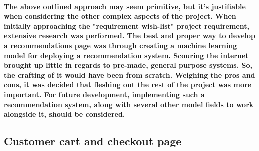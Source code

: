 \documentclass[sigconf]{acmart}
\begin{document}
\paragraph{ The above outlined approach may seem primitive, but it's justifiable when considering the other complex aspects of the project. When initially approaching the "requirement wish-list" project requirement, extensive research was performed. The best and proper way to develop a recommendations page was through creating a machine learning model for deploying a recommendation system. Scouring the internet brought up little in regards to pre-made, general purpose systems. So, the crafting of it would have been from scratch. Weighing the pros and cons, it was decided that fleshing out the rest of the project was more important. For future development, implementing such a recommendation system, along with several other model fields to work alongside it, should be considered. }   

\subsection{Customer cart and checkout page}
\end{document}
